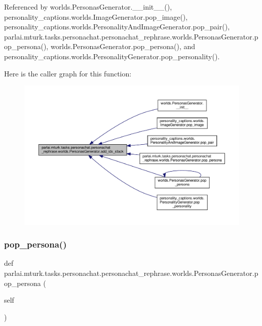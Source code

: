 Referenced by worlds.\+Personas\+Generator.\+\_\+\+\_\+init\+\_\+\+\_\+(), personality\+\_\+captions.\+worlds.\+Image\+Generator.\+pop\+\_\+image(), personality\+\_\+captions.\+worlds.\+Personality\+And\+Image\+Generator.\+pop\+\_\+pair(), parlai.\+mturk.\+tasks.\+personachat.\+personachat\+\_\+rephrase.\+worlds.\+Personas\+Generator.\+pop\+\_\+persona(), worlds.\+Personas\+Generator.\+pop\+\_\+persona(), and personality\+\_\+captions.\+worlds.\+Personality\+Generator.\+pop\+\_\+personality().

Here is the caller graph for this function\+:
\nopagebreak
\begin{figure}[H]
\begin{center}
\leavevmode
\includegraphics[width=350pt]{classparlai_1_1mturk_1_1tasks_1_1personachat_1_1personachat__rephrase_1_1worlds_1_1PersonasGenerator_af1fe911f6615919580c9beb7f1ce04c0_icgraph}
\end{center}
\end{figure}
\mbox{\label{classparlai_1_1mturk_1_1tasks_1_1personachat_1_1personachat__rephrase_1_1worlds_1_1PersonasGenerator_a3af572bb691c40bcbb9df5fe5fdb318d}} 
\subsubsection{\texorpdfstring{pop\+\_\+persona()}{pop\_persona()}}
{\footnotesize\ttfamily def parlai.\+mturk.\+tasks.\+personachat.\+personachat\+\_\+rephrase.\+worlds.\+Personas\+Generator.\+pop\+\_\+persona (\begin{DoxyParamCaption}\item[{}]{self }\end{DoxyParamCaption})}



